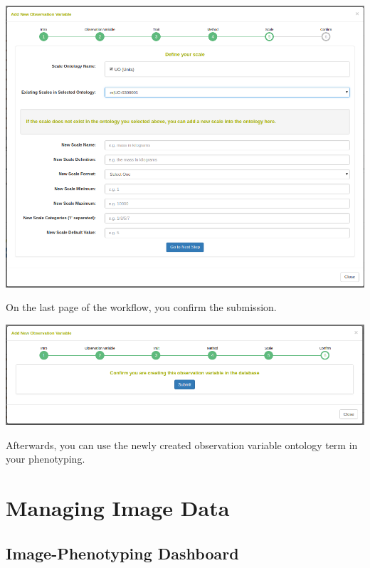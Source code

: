 \documentclass[
  12pt,
]{book}
\begin{document}
\begin{center}\includegraphics[width=0.95\linewidth]{assets/images/manage_observation_variables_workflow_scale} \end{center}

On the last page of the workflow, you confirm the submission.

\begin{center}\includegraphics[width=0.95\linewidth]{assets/images/manage_observation_variables_workflow_submit} \end{center}

Afterwards, you can use the newly created observation variable ontology term in your phenotyping.

\hypertarget{managing-image-data}{%
\chapter{Managing Image Data}\label{managing-image-data}}

\hypertarget{image-phenotyping-dashboard}{%
\section{Image-Phenotyping Dashboard}\label{image-phenotyping-dashboard}}
\end{document}
